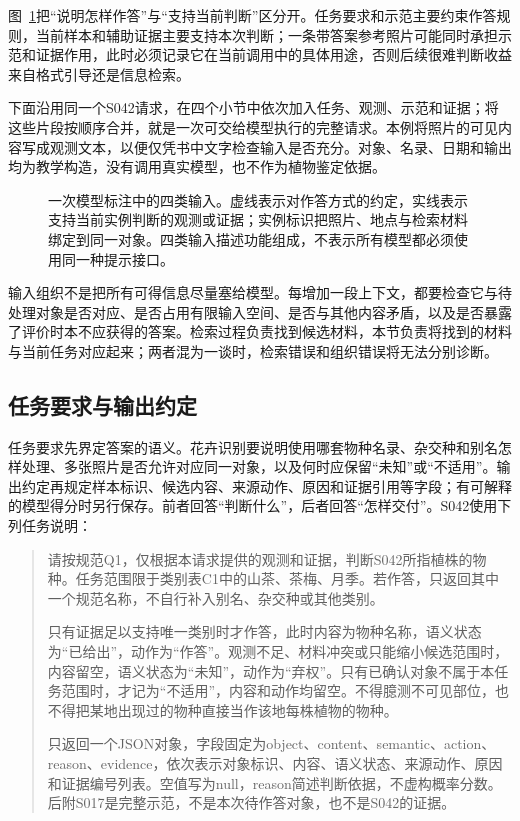 图~\ref{fig:knowledge-acquisition-input-composition}把“说明怎样作答”与“支持当前判断”区分开。任务要求和示范主要约束作答规则，当前样本和辅助证据主要支持本次判断；一条带答案参考照片可能同时承担示范和证据作用，此时必须记录它在当前调用中的具体用途，否则后续很难判断收益来自格式引导还是信息检索。

下面沿用同一个S042请求，在四个小节中依次加入任务、观测、示范和证据；将这些片段按顺序合并，就是一次可交给模型执行的完整请求。本例将照片的可见内容写成观测文本，以便仅凭书中文字检查输入是否充分。对象、名录、日期和输出均为教学构造，没有调用真实模型，也不作为植物鉴定依据。

\begin{figure}[htbp]
  \centering
  
  \caption{一次模型标注中的四类输入。虚线表示对作答方式的约定，实线表示支持当前实例判断的观测或证据；实例标识把照片、地点与检索材料绑定到同一对象。四类输入描述功能组成，不表示所有模型都必须使用同一种提示接口。}
  \label{fig:knowledge-acquisition-input-composition}
\end{figure}

输入组织不是把所有可得信息尽量塞给模型。每增加一段上下文，都要检查它与待处理对象是否对应、是否占用有限输入空间、是否与其他内容矛盾，以及是否暴露了评价时本不应获得的答案。检索过程负责找到候选材料，本节负责将找到的材料与当前任务对应起来；两者混为一谈时，检索错误和组织错误将无法分别诊断。

\subsection{任务要求与输出约定}
\label{sec:knowledge-acquisition-task-output-contract}

任务要求先界定答案的语义。花卉识别要说明使用哪套物种名录、杂交种和别名怎样处理、多张照片是否允许对应同一对象，以及何时应保留“未知”或“不适用”。输出约定再规定样本标识、候选内容、来源动作、原因和证据引用等字段；有可解释的模型得分时另行保存。前者回答“判断什么”，后者回答“怎样交付”。S042使用下列任务说明：

\begin{quote}
  请按规范Q1，仅根据本请求提供的观测和证据，判断S042所指植株的物种。任务范围限于类别表C1中的山茶、茶梅、月季。若作答，只返回其中一个规范名称，不自行补入别名、杂交种或其他类别。

  只有证据足以支持唯一类别时才作答，此时内容为物种名称，语义状态为“已给出”，动作为“作答”。观测不足、材料冲突或只能缩小候选范围时，内容留空，语义状态为“未知”，动作为“弃权”。只有已确认对象不属于本任务范围时，才记为“不适用”，内容和动作均留空。不得臆测不可见部位，也不得把某地出现过的物种直接当作该地每株植物的物种。

  只返回一个JSON对象，字段固定为object、content、semantic、action、reason、evidence，依次表示对象标识、内容、语义状态、来源动作、原因和证据编号列表。空值写为null，reason简述判断依据，不虚构概率分数。后附S017是完整示范，不是本次待作答对象，也不是S042的证据。
\end{quote}

